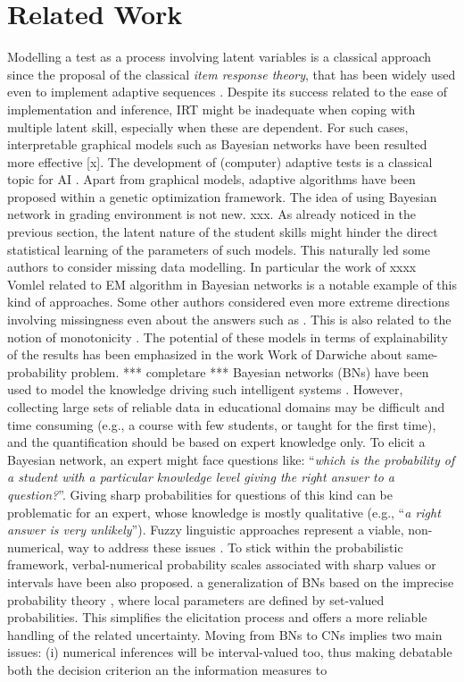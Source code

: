 \documentclass[runningheads]{llncs}
\begin{document}
\section{Related Work}\label{sec:work}
Modelling a test as a process involving latent variables is a classical approach since the proposal of the classical \emph{item response theory}, that has been widely used even to implement adaptive sequences \cite{xxx}. Despite its success related to the ease of implementation and inference, IRT might be inadequate when coping with multiple latent skill, especially when these are dependent. For such cases, interpretable graphical models such as Bayesian networks have been resulted more effective [x]. The development of (computer) adaptive tests is a classical topic for AI \cite{xx}. Apart from graphical models, adaptive algorithms have been proposed within a genetic optimization framework. The idea of using Bayesian network in grading environment is not new. xxx. As already noticed in the previous section, the latent nature of the student skills might hinder the direct statistical learning of the parameters of such models. This naturally led some authors to consider missing data modelling. In particular the work of xxxx Vomlel related to EM algorithm in Bayesian networks is a notable example of this kind of approaches. Some other authors considered even more extreme directions involving missingness even about the answers such as \cite{bachrach2012grade}. This is also related to the notion of monotonicity \cite{plajner2020monotonicity}. The potential of these models in terms of explainability of the results has been emphasized in the work Work of Darwiche about same-probability problem. *** completare *** Bayesian networks (BNs) \cite{koller2009} have been used to model the knowledge driving such intelligent systems \cite{almond2015bayesian}. However, collecting large sets of reliable data in educational domains may be difficult and time consuming (e.g., a course with few students, or taught for the first time), and the quantification should be based on expert knowledge only. To elicit a Bayesian network, an expert might face questions like: ``\emph{which is the probability of a student with a particular knowledge level giving the right answer to a question?}''. Giving sharp probabilities for questions of this kind can be problematic for an expert, whose knowledge is mostly qualitative (e.g., ``\emph{a right answer is very unlikely}''). Fuzzy linguistic approaches represent a viable, non-numerical, way to address these issues \cite{badaracco2013fuzzy}. To stick within the probabilistic framework, verbal-numerical probability scales associated with sharp values \cite{renooij1999talking} or intervals \cite{walley1991statistical} have been also proposed. a generalization of BNs based on the imprecise probability theory \cite{walley1991statistical}, where local parameters are defined by set-valued probabilities. This simplifies the elicitation process and offers a more reliable handling of the related uncertainty. Moving from BNs to CNs implies two main issues: (i) numerical inferences will be interval-valued too, thus making debatable both the decision criterion \cite{troffaes} an the information measures \cite{klir1999uncertainty} to 
\end{document}
